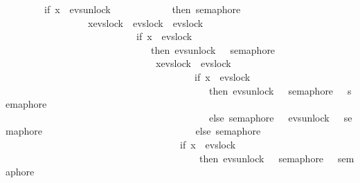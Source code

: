 \begin{isabellebody}
\ \ \ \ \ \ \ {\isasymrightarrow}\ {\isacharparenleft}{\kern0pt}if\ x\ {\isacharequal}{\kern0pt}\ evs{\isachardot}{\kern0pt}unlock\ {}\isanewline
\ \ \ \ \ \ \ \ \ \ \ then\ semaphore\ {}\isanewline
\ \ \ \ \ \ \ \ \ \ \ \ \ \ \ \ {\isacharbar}{\kern0pt}{\isacharbar}{\kern0pt}{\isacharbar}{\kern0pt}\ {\isasymbox}x{\isasymin}{\isacharbraceleft}{\kern0pt}evs{\isachardot}{\kern0pt}lock\ {}{\isacharcomma}{\kern0pt}\ evs{\isachardot}{\kern0pt}lock\ {}{\isacharcomma}{\kern0pt}\ evs{\isachardot}{\kern0pt}lock\ {}{\isacharbraceright}{\kern0pt}\isanewline
\ \ \ \ \ \ \ \ \ \ \ \ \ \ \ \ \ \ \ \ \ \ \ \ \ \ {\isasymrightarrow}\ {\isacharparenleft}{\kern0pt}if\ x\ {\isacharequal}{\kern0pt}\ evs{\isachardot}{\kern0pt}lock\ {}\isanewline
\ \ \ \ \ \ \ \ \ \ \ \ \ \ \ \ \ \ \ \ \ \ \ \ \ \ \ \ \ \ then\ evs{\isachardot}{\kern0pt}unlock\ {}\ {\isasymrightarrow}\ semaphore\ {}\isanewline
\ \ \ \ \ \ \ \ \ \ \ \ \ \ \ \ \ \ \ \ \ \ \ \ \ \ \ \ \ \ {\isacharbar}{\kern0pt}{\isacharbar}{\kern0pt}{\isacharbar}{\kern0pt}\ {\isasymbox}x{\isasymin}{\isacharbraceleft}{\kern0pt}evs{\isachardot}{\kern0pt}lock\ {}{\isacharcomma}{\kern0pt}\ evs{\isachardot}{\kern0pt}lock\ {}{\isacharbraceright}{\kern0pt}\isanewline
\ \ \ \ \ \ \ \ \ \ \ \ \ \ \ \ \ \ \ \ \ \ \ \ \ \ \ \ \ \ \ \ \ \ \ \ \ \ {\isasymrightarrow}\ {\isacharparenleft}{\kern0pt}if\ x\ {\isacharequal}{\kern0pt}\ evs{\isachardot}{\kern0pt}lock\ {}\ \isanewline
\ \ \ \ \ \ \ \ \ \ \ \ \ \ \ \ \ \ \ \ \ \ \ \ \ \ \ \ \ \ \ \ \ \ \ \ \ \ \ \ \ \ then\ evs{\isachardot}{\kern0pt}unlock\ {}\ {\isasymrightarrow}\ semaphore\ {}\ {\isacharbar}{\kern0pt}{\isacharbar}{\kern0pt}{\isacharbar}{\kern0pt}\ semaphore\ {}\isanewline
\ \ \ \ \ \ \ \ \ \ \ \ \ \ \ \ \ \ \ \ \ \ \ \ \ \ \ \ \ \ \ \ \ \ \ \ \ \ \ \ \ \ else\ semaphore\ {}\ {\isacharbar}{\kern0pt}{\isacharbar}{\kern0pt}{\isacharbar}{\kern0pt}\ evs{\isachardot}{\kern0pt}unlock\ {}\ {\isasymrightarrow}\ semaphore\ {}{\isacharparenright}{\kern0pt}\isanewline
\ \ \ \ \ \ \ \ \ \ \ \ \ \ \ \ \ \ \ \ \ \ \ \ \ \ \ \ \ \ else\ semaphore\ \ {}\isanewline
\ \ \ \ \ \ \ \ \ \ \ \ \ \ \ \ \ \ \ \ \ \ \ \ \ \ \ \ \ \ \ \ \ \ \ {\isacharbar}{\kern0pt}{\isacharbar}{\kern0pt}{\isacharbar}{\kern0pt}\ {\isacharparenleft}{\kern0pt}if\ x\ {\isacharequal}{\kern0pt}\ evs{\isachardot}{\kern0pt}lock\ {}\ \isanewline
\ \ \ \ \ \ \ \ \ \ \ \ \ \ \ \ \ \ \ \ \ \ \ \ \ \ \ \ \ \ \ \ \ \ \ \ \ \ \ \ then\ evs{\isachardot}{\kern0pt}unlock\ {}\ {\isasymrightarrow}\ semaphore\ {}\ {\isacharbar}{\kern0pt}{\isacharbar}{\kern0pt}{\isacharbar}{\kern0pt}\ semaphore\ {}\isanewline

\end{isabellebody}

